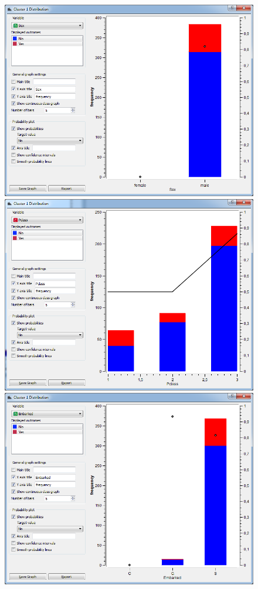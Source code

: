 \documentclass[a4paper,11pt]{article}
\begin{document}
\begin{figure}[h]
	\centering
	\begin{center}
		\includegraphics[scale=0.30]{ClusterDistribution/Cluster1/Sex}
		\includegraphics[scale=0.30]{ClusterDistribution/Cluster1/PClass}\\
		\vspace{1 mm}
		\includegraphics[scale=0.30]{ClusterDistribution/Cluster1/Embarked}

\end{center}
\end{figure}
\end{document}
